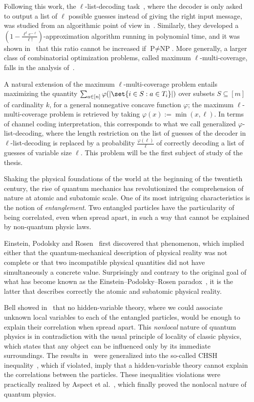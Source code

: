 Following this work, the $\ell$-list-decoding task~\cite{Elias57,Wozencraft58}, where the decoder is only asked to output a list of $\ell$ possible guesses instead of giving the right input message, was studied from an algorithmic point of view in~\cite{BFGG20}. Similarly, they developed a $\left(1-\frac{\ell^{\ell}e^{-\ell}}{\ell!}\right)$-approximation algorithm running in polynomial time, and it was shown in~\cite{DMMS20} that this ratio cannot be increased if $\textrm{P}\not=\textrm{NP}$. More generally, a larger class of combinatorial optimization problems, called maximum $\ell$-multi-coverage, falls in the analysis of~\cite{BFGG20}.

A natural extension of the maximum $\ell$-multi-coverage problem entails maximizing the quantity $\sum_{a \in [n]}  \varphi(\abs{\set{i \in S : a \in T_i}})$ over subsets $S \subseteq [m]$ of cardinality $k$, for a general nonnegative concave function $\varphi$; the  maximum $\ell$-multi-coverage problem is retrieved by taking $\varphi(x) := \min(x,\ell)$. In terms of channel coding interpretation, this corresponds to what we call generalized $\varphi$-list-decoding, where the length restriction on the list of guesses of the decoder in $\ell$-list-decoding is replaced by a probability $\frac{\varphi(\ell)}{\ell}$ of correctly decoding a list of guesses of variable size $\ell$. This problem will be the first subject of study of the thesis.

Shaking the physical foundations of the world at the beginning of the twentieth century, the rise of quantum mechanics has revolutionized the comprehension of nature at atomic and subatomic scale. One of its most intriguing characteristics is the notion of \emph{entanglement}. Two entangled particles have the particularity of being correlated, even when spread apart, in such a way that cannot be explained by non-quantum physic laws.

Einstein, Podolsky and Rosen~\cite{EPR35} first discovered that phenomenon, which implied either that the quantum-mechanical description of physical reality was not complete or that two incompatible physical quantities did not have simultaneously a concrete value. Surprisingly and contrary to the original goal of what has become known as the Einstein–Podolsky–Rosen paradox~\cite{EPR35}, it is the latter that describes correctly the atomic and subatomic physical reality.

Bell showed in~\cite{Bell64} that no hidden-variable theory, where we could associate unknown local variables to each of the entangled particles, would be enough to explain their correlation when spread apart. This \emph{nonlocal} nature of quantum physics is in contradiction with the usual principle of locality of classic physics, which states that any object can be influenced only by its immediate surroundings. The results in~\cite{Bell64} were generalized into the so-called CHSH inequality~\cite{CHSH69}, which if violated, imply that a hidden-variable theory cannot explain the correlations between the particles. These inequalities violations were practically realized by Aspect et al.~\cite{ADG82}, which finally proved the nonlocal nature of quantum physics.

